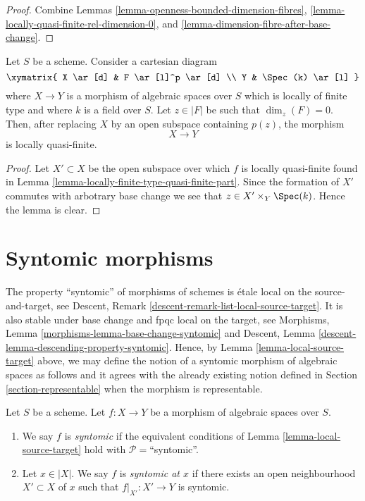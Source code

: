 \begin{proof}
Combine
Lemmas \ref{lemma-openness-bounded-dimension-fibres},
\ref{lemma-locally-quasi-finite-rel-dimension-0}, and
\ref{lemma-dimension-fibre-after-base-change}.
\end{proof}

\begin{lemma}
\label{lemma-quasi-finite-at-point}
Let $S$ be a scheme. Consider a cartesian diagram
$$
\xymatrix{
X \ar[d] & F \ar[l]^p \ar[d] \\
Y & \Spec(k) \ar[l]
}
$$
where $X \to Y$ is a morphism of algebraic spaces over $S$ which is
locally of finite type and where $k$ is a field over $S$.
Let $z \in |F|$ be such that $\dim_z(F) = 0$. Then, after replacing $X$
by an open subspace containing $p(z)$, the morphism
$$
X \longrightarrow Y
$$
is locally quasi-finite.
\end{lemma}

\begin{proof}
Let $X' \subset X$ be the open subspace over which $f$ is locally quasi-finite
found in
Lemma \ref{lemma-locally-finite-type-quasi-finite-part}.
Since the formation of $X'$ commutes with arbotrary base change we see
that $z \in X' \times_Y \Spec(k)$. Hence the lemma is clear.
\end{proof}






\section{Syntomic morphisms}
\label{section-syntomic}

\noindent
The property ``syntomic'' of morphisms of schemes is
\'etale local on the source-and-target, see
Descent, Remark \ref{descent-remark-list-local-source-target}.
It is also stable under base change and fpqc local on the target, see
Morphisms, Lemma \ref{morphisms-lemma-base-change-syntomic} and
Descent, Lemma \ref{descent-lemma-descending-property-syntomic}.
Hence, by
Lemma \ref{lemma-local-source-target}
above, we may define the notion of a syntomic morphism of algebraic spaces as
follows and it agrees with the already existing notion defined in
Section \ref{section-representable}
when the morphism is representable.

\begin{definition}
\label{definition-syntomic}
Let $S$ be a scheme.
Let $f : X \to Y$ be a morphism of algebraic spaces over $S$.
\begin{enumerate}
\item We say $f$ is {\it syntomic} if the equivalent conditions of
Lemma \ref{lemma-local-source-target}
hold with $\mathcal{P} =$``syntomic''.
\item Let $x \in |X|$. We say $f$ is {\it syntomic at $x$} if
there exists an open neighbourhood $X' \subset X$ of $x$ such
that $f|_{X'} : X' \to Y$ is syntomic.
\end{enumerate}
\end{definition}

